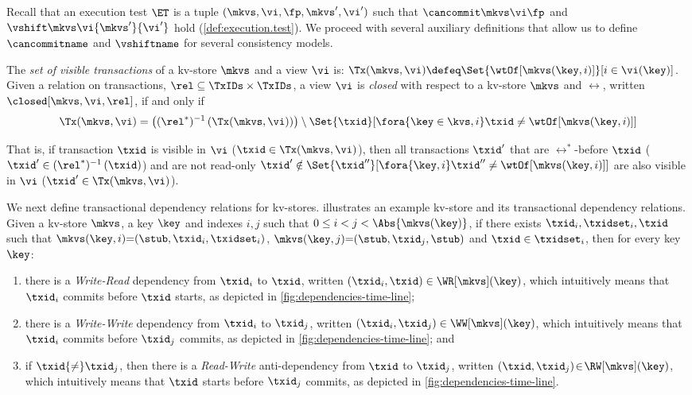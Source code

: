 Recall that an execution test \(\ET\) is a tuple \((\mkvs,\vi, \fp, \allowbreak \mkvs', \vi')\) such that 
\(\cancommit \mkvs \vi \fp\) and \(\vshift \mkvs \vi {\mkvs'} {\vi'}\) hold (\cref{def:execution.test}).
We proceed with several auxiliary definitions that allow us to define \(\cancommitname\) and \(\vshiftname\) for several consistency models. 



The {\em set of visible transactions} of a kv-store \(\mkvs\) and a view \(\vi\) is:
\( \Tx(\mkvs, \vi)  \defeq \Set{\wtOf[\mkvs(\key, i)] }[ i \in \vi(\key)] \).
Given a relation on transactions, \(\rel \subseteq \TxIDs \times \TxIDs\),
a view \(\vi\) is \emph{closed} with respect to a kv-store \(\mkvs\)
and \(\rel\), written \(\closed[\mkvs,\vi,\rel]\),  if and only if 
\[
	\Tx(\mkvs, \vi) = 
	\left( (\rel^*)^{-1} \left( \Tx(\mkvs, \vi) \right) \right) \setminus \Set{\txid }[ \fora{\key \in \kvs ,i} \txid \neq \wtOf[\mkvs(\key,i)] ]
\]

That is, if transaction \(\txid\) is visible in \(\vi\) (\( \txid \in \Tx(\mkvs, \vi) \)),
then all transactions \( \txid'  \) that are \(\rel^*\)-before \(\txid\) (\(\txid' \in (\rel^*)^{-1} \left( \txid \right)\))
and are not read-only \( \txid' \notin \Set{\txid'' }[ \fora{\key,i} \txid'' \neq \wtOf[\mkvs(\key,i)] ] \)
are also visible in \(\vi\) (\( \txid' \in \Tx(\mkvs, \vi) \)).

We next define transactional dependency relations for kv-stores.
 illustrates an example kv-store and
its transactional dependency relations.
Given a kv-store \(\mkvs\), a key \(\key\) and 
indexes \(i,j\) such that  \(0 \leq i < j < \Abs{ \mkvs(\key) }\), 
if there exists \(\txid_i, \txidset_i, \txid\) such that 
\(\mkvs(\key, i)  {=} (\stub, \txid_{i}, \txidset_{i})\), \(\mkvs(\key,j) {=} (\stub, \txid_{j}, \stub)\)
and \(\txid \in \txidset_{i}\), 
then for every key \( \key \):

\begin{enumerate} 
\item there is a \emph{Write-Read} dependency from \(\txid_{i}\) to \(\txid\), written \((\txid_{i},\txid) \in \WR[\mkvs](\key)\),
which intuitively means that \( \txid_{i} \) commits before \( \txid \) starts, as depicted in \cref{fig:dependencies-time-line};
\item there is a \emph{Write-Write} dependency from \(\txid_{i}\) to \(\txid_{j}\), 
written \((\txid_{i},\txid_{j}) \in \WW[\mkvs](\key) \),
which intuitively means that \( \txid_{i} \) commits before \( \txid_j \) commits, as depicted in \cref{fig:dependencies-time-line}; and 
\item if \(\txid {\neq} \txid_{j}\), then there is a \emph{Read-Write} anti-dependency from \(\txid\) to \(\txid_{j}\), written \((\txid,\txid_j) \!\in\! \RW[\mkvs](\key)\),
which intuitively means that \( \txid \) starts before \( \txid_j \) commits, as depicted in \cref{fig:dependencies-time-line}.
\end{enumerate}

